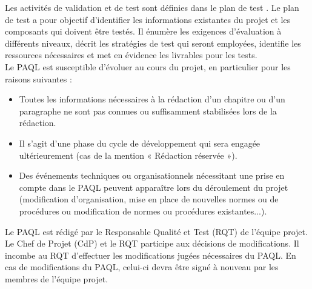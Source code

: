 \documentclass[a4paper,11pt,titlepage]{article}
\newcounter{subsubsubsection}[subsubsection]
\begin{document}
Les activités de validation et de test sont définies dans le plan de test \cite[\refPlanTest]{PDT}. Le plan de test a pour objectif d'identifier les informations existantes du projet et les composants qui doivent être testés. Il énumère les exigences d'évaluation à différents niveaux, décrit les stratégies de test qui seront employées, identifie les ressources nécessaires et met en évidence les livrables pour les tests.\\

Le PAQL est susceptible d'évoluer au cours du projet, en particulier pour les raisons suivantes :
\begin{itemize}
    \item Toutes les informations nécessaires à la rédaction d'un chapitre ou d'un paragraphe ne sont pas connues ou suffisamment stabilisées lors de la rédaction.
    \item Il s'agit d'une phase du cycle de développement qui sera engagée ultérieurement (cas de la mention « Rédaction réservée »).
    \item Des événements techniques ou organisationnels nécessitant une prise en compte dans le PAQL peuvent apparaître lors du déroulement du projet (modification d'organisation, mise en place de nouvelles normes ou de procédures ou modification de normes ou procédures existantes...).
\end{itemize}
Le PAQL est rédigé par le Responsable Qualité et Test (RQT) de l'équipe projet. Le Chef de Projet (CdP) et le RQT participe aux décisions de modifications. Il incombe au RQT d'effectuer les modifications jugées nécessaires du PAQL. En cas de modifications du PAQL, celui-ci devra être signé à nouveau par les membres de l'équipe projet.
\end{document}

